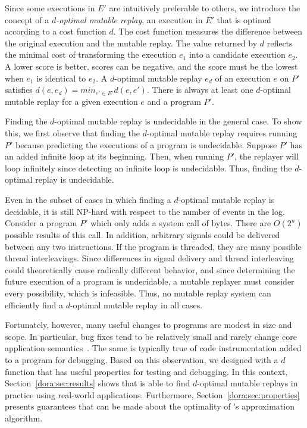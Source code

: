 Since some executions in $E'$ are intuitively preferable to others, we introduce the
concept of a \emph{$d$-optimal mutable replay}, an execution in $E'$
that is optimal according to a cost function $d$.  The cost function
measures the difference between the original execution
and the mutable replay.  The value returned by $d$ reflects the minimal cost
of transforming the execution $e_1$ into a candidate execution
$e_2$. A lower score is better, scores can be negative, and the score
must be the lowest when $e_1$ is identical to $e_2$. A $d$-optimal
mutable replay $e_{d}$ of an execution $e$ on $P'$ satisfies $d(e, e_{d}) = min_{e' \in E'}
d(e, e')$. There is always at least one $d$-optimal mutable replay for
a given execution $e$ and a program $P'$.

Finding the $d$-optimal mutable replay is undecidable in the general
case. To show this, we first observe that finding the $d$-optimal mutable
replay requires running $P'$ because predicting the executions of a
program is undecidable. Suppose $P'$ has an added infinite loop at its
beginning. Then, when running $P'$, the replayer will loop infinitely
since detecting an infinite loop is undecidable. Thus, finding the $d$-optimal
replay is undecidable.

Even in the subset of cases in which finding a $d$-optimal mutable
replay is decidable, it is still NP-hard with respect to the number of events in
the log. Consider a program $P'$
which only adds a  system call of  bytes. There are
$O(2^{n})$ possible results of this call. In addition, arbitrary signals could be
delivered between any two instructions. If the program is threaded,
they are many possible thread interleavings. Since
differences in signal delivery and thread interleaving could
theoretically cause radically different behavior, and since determining the
future execution of a program is undecidable, a mutable replayer must
consider every possibility, which is infeasible. Thus, no mutable replay system
can efficiently find a $d$-optimal mutable replay in all cases.

Fortunately, however, many useful changes to programs are modest in size and scope.
In particular, bug fixes tend to be relatively small and rarely change
core application semantics~\cite{delta,mreplay-feas}.  The same is
typically true of code instrumentation added to a program for
debugging. Based on this observation, we designed {\dora} with a
$d$ function that has useful properties for testing and debugging.  In
this context, Section~\ref{dora:sec:results} shows that {\dora} is able
to find $d$-optimal mutable replays in practice using real-world
applications. Furthermore, Section~\ref{dora:sec:properties} presents
guarantees that can be made about the optimality of {\dora}'s
approximation algorithm.


